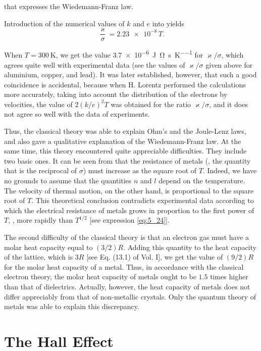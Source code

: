 \noindent
that expresses the Wiedemann-Franz law.

Introduction of the numerical values of $k$ and $e$ into  yields
\begin{equation*}
    \frac{\varkappa}{\sigma} = \num{2.23e-8}\, T.
\end{equation*}

\noindent
When $T = \SI{300}{\kelvin}$, we get the value \SI{3.7e-6}{\joule\ohm\per\second\per\kelvin} for $\varkappa/\sigma$, which agrees quite well with experimental data (see the values of $\varkappa/\sigma$ given above for aluminium, copper, and lead).
It was later established, however, that such a good coincidence is accidental, because when H. Lorentz performed the calculations more accurately, taking
into account the distribution of the electrons by velocities, the value of $2(k/e)^2 T$ was obtained for the ratio $\varkappa/\sigma$, and it does not agree so well with the data of experiments.

Thus, the classical theory was able to explain Ohm's and the Joule-Lenz laws, and also gave a qualitative explanation of the Wiedemann-Franz law.
At the same time, this theory encountered quite appreciable difficulties.
They include two basic ones.
It can be seen from  that the resistance of metals (\ie, the quantity that is the reciprocal of $\sigma$) must increase as the square root of $T$.
Indeed, we have no grounds to assume that the quantities $n$ and $l$ depend on the temperature.
The velocity of thermal motion, on the other hand, is proportional to the square root of $T$.
This theoretical conclusion contradicts experimental data according to which the electrical resistance of metals grows in proportion to the first power of $T$, \ie, more rapidly than $T^{1/2}$ [see expression \eqref{eq:5_24}].

The second difficulty of the classical theory is that an electron gas must have a molar heat capacity equal to $(3/2)R$.
Adding this quantity to the heat capacity of the lattice, which is $3R$ [see Eq. (13.1) of Vol. I], we get the value of $(9/2)R$ for the molar heat capacity of a metal.
Thus, in accordance with the classical electron theory, the molar heat capacity of metals ought to be $1.5$ times higher than that of dielectrics.
Actually, however, the heat capacity of metals does not differ appreciably from that of non-metallic crystals.
Only the quantum theory of metals was able to explain this discrepancy.

\section{The Hall Effect}\label{sec:11_3}

